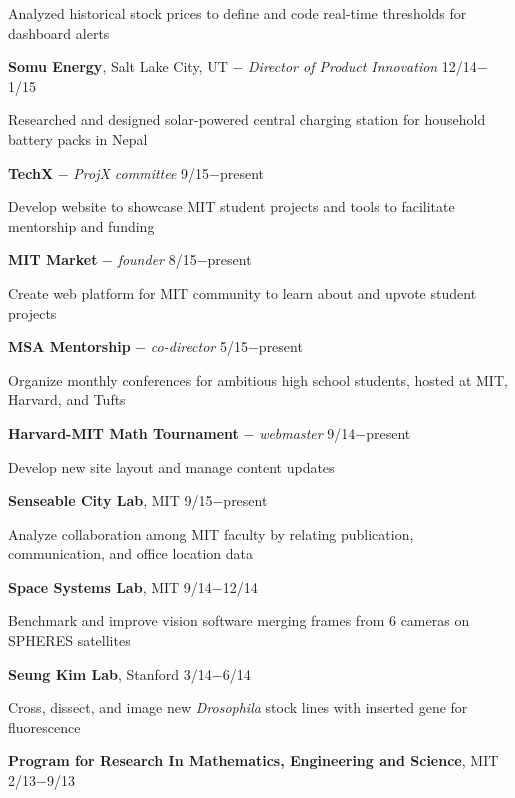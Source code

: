 \documentclass[11pt]{article}
\newcommand{\msection}[1]{\vspace{1em}\marginnote{#1}} %
\newcommand{\bt}[1]{\textbf{#1}} %
\newcommand{\gap}[0]{\vspace{0.5em}} %
\newcommand{\dash}[0]{ $-$ } %
\begin{document}
Analyzed historical stock prices to define and code real-time thresholds for dashboard alerts

\gap

\bt{Somu Energy}, Salt Lake City, UT\dash \emph{Director of Product Innovation} \hfill 12/14$-$1/15

Researched and designed solar-powered central charging station for household battery packs in Nepal





\msection{Leadership}
\bt{TechX}\dash \emph{ProjX committee} \hfill 9/15$-$present

Develop website to showcase MIT student projects and tools to facilitate mentorship and funding

\gap

\bt{MIT Market}\dash \emph{founder} \hfill 8/15$-$present

Create web platform for MIT community to learn about and upvote student projects

\gap

\bt{MSA Mentorship}\dash \emph{co-director} \hfill 5/15$-$present

Organize monthly conferences for ambitious high school students, hosted at MIT, Harvard, and Tufts

\gap

\bt{Harvard-MIT Math Tournament}\dash \emph{webmaster} \hfill 9/14$-$present

Develop new site layout and manage content updates


\msection{Research}

\bt{Senseable City Lab}, MIT \hfill 9/15$-$present

Analyze collaboration among MIT faculty by relating publication, communication, and office location data

\gap

\bt{Space Systems Lab}, MIT \hfill 9/14$-$12/14

Benchmark and improve vision software merging frames from 6 cameras on SPHERES satellites

\gap

\bt{Seung Kim Lab}, Stanford \hfill 3/14$-$6/14

Cross, dissect, and image new \emph{Drosophila} stock lines with inserted gene for fluorescence

\gap

\bt{Program for Research In Mathematics, Engineering and Science}, MIT \hfill 2/13$-$9/13
\end{document}
